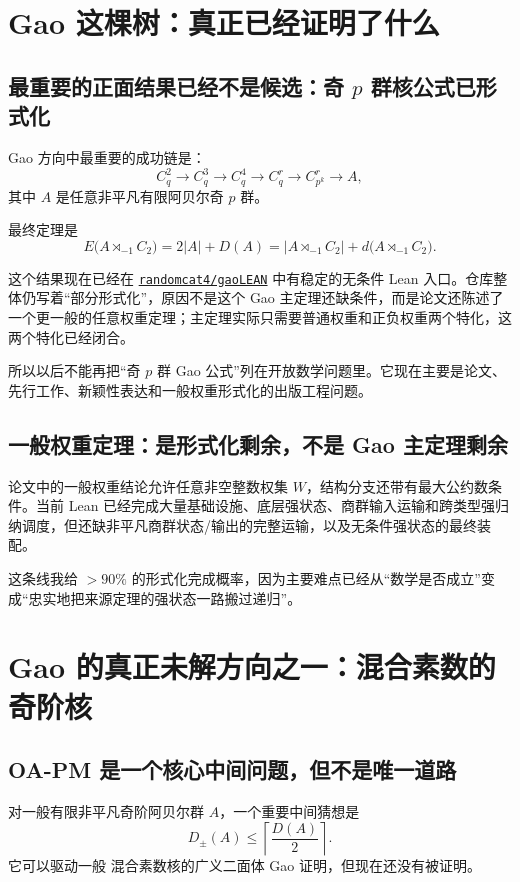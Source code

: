 \documentclass[11pt,a4paper]{ctexart}
\newcommand{\repo}[2]{\href{#2}{\texttt{#1}}}
\begin{document}
\section{Gao 这棵树：真正已经证明了什么}

\subsection{最重要的正面结果已经不是候选：奇 $p$ 群核公式已形式化}

Gao 方向中最重要的成功链是：
\[
C_q^2\to C_q^3\to C_q^4\to C_q^r\to C_{p^k}^r\to A,
\]
其中 $A$ 是任意非平凡有限阿贝尔奇 $p$ 群。

最终定理是
\[
\boxed{
E\bigl(A\rtimes_{-1}C_2\bigr)
=2|A|+D(A)
=|A\rtimes_{-1}C_2|+d\bigl(A\rtimes_{-1}C_2\bigr).
}
\]

这个结果现在已经在 \repo{randomcat4/gaoLEAN}{https://github.com/randomcat4/gaoLEAN} 中有稳定的无条件 Lean 入口。仓库整体仍写着“部分形式化”，原因不是这个 Gao 主定理还缺条件，而是论文还陈述了一个更一般的任意权重定理；主定理实际只需要普通权重和正负权重两个特化，这两个特化已经闭合。

所以以后不能再把“奇 $p$ 群 Gao 公式”列在开放数学问题里。它现在主要是论文、先行工作、新颖性表达和一般权重形式化的出版工程问题。

\subsection{一般权重定理：是形式化剩余，不是 Gao 主定理剩余}

论文中的一般权重结论允许任意非空整数权集 $W$，结构分支还带有最大公约数条件。当前 Lean 已经完成大量基础设施、底层强状态、商群输入运输和跨类型强归纳调度，但还缺非平凡商群状态/输出的完整运输，以及无条件强状态的最终装配。

这条线我给 $>90\%$ 的形式化完成概率，因为主要难点已经从“数学是否成立”变成“忠实地把来源定理的强状态一路搬过递归”。

\section{Gao 的真正未解方向之一：混合素数的奇阶核}

\subsection{OA-PM 是一个核心中间问题，但不是唯一道路}

对一般有限非平凡奇阶阿贝尔群 $A$，一个重要中间猜想是
\[
D_{\pm}(A)\le \left\lceil\frac{D(A)}2\right\rceil.
\]
它可以驱动一般 混合素数核的广义二面体 Gao 证明，但现在还没有被证明。
\end{document}
